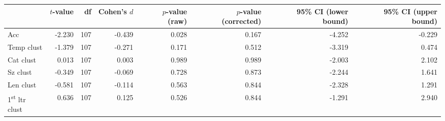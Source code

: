 \begin{tabular}{lrrrrrrr}
\toprule
 & $t$-value & df & Cohen's $d$ & $p$-value (raw) & $p$-value (corrected) & 95\% CI (lower bound) & 95\% CI (upper bound) \\
\midrule
\rowcolor[HTML]{f5f5f5} Acc & -2.230 & 107 & -0.439 & 0.028 & 0.167 & -4.252 & -0.229 \\
 Temp clust & -1.379 & 107 & -0.271 & 0.171 & 0.512 & -3.319 & 0.474 \\
 Cat clust & 0.013 & 107 & 0.003 & 0.989 & 0.989 & -2.003 & 2.102 \\
 Sz clust & -0.349 & 107 & -0.069 & 0.728 & 0.873 & -2.244 & 1.641 \\
 Len clust & -0.581 & 107 & -0.114 & 0.563 & 0.844 & -2.328 & 1.291 \\
 1\textsuperscript{st} ltr clust & 0.636 & 107 & 0.125 & 0.526 & 0.844 & -1.291 & 2.940 \\
\bottomrule
\end{tabular}
